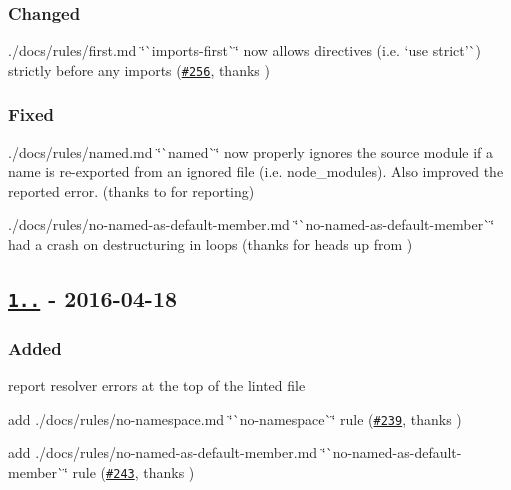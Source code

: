 \subsubsection*{Changed}


\begin{DoxyItemize}
\item ./docs/rules/first.md \char`\"{}\`{}imports-\/first\`{}\char`\"{} now allows directives (i.\+e. `\textquotesingle{}use strict'\`{}) strictly before any imports (\href{https://github.com/benmosher/eslint-plugin-import/pull/256}{\tt \#256}, thanks \href{https://github.com/lemonmade}{\tt })
\end{DoxyItemize}

\subsubsection*{Fixed}


\begin{DoxyItemize}
\item ./docs/rules/named.md \char`\"{}\`{}named\`{}\char`\"{} now properly ignores the source module if a name is re-\/exported from an ignored file (i.\+e. {\ttfamily node\+\_\+modules}). Also improved the reported error. (thanks to \href{https://github.com/jimbolla}{\tt } for reporting)
\item ./docs/rules/no-\/named-\/as-\/default-\/member.md \char`\"{}\`{}no-\/named-\/as-\/default-\/member\`{}\char`\"{} had a crash on destructuring in loops (thanks for heads up from \href{https://github.com/lemonmade}{\tt })
\end{DoxyItemize}

\subsection*{\href{https://github.com/benmosher/eslint-plugin-import/compare/v1.4.0...v1.5.0}{\tt 1..} -\/ 2016-\/04-\/18}

\subsubsection*{Added}


\begin{DoxyItemize}
\item report resolver errors at the top of the linted file
\item add ./docs/rules/no-\/namespace.md \char`\"{}\`{}no-\/namespace\`{}\char`\"{} rule (\href{https://github.com/benmosher/eslint-plugin-import/pull/239}{\tt \#239}, thanks \href{https://github.com/singles}{\tt })
\item add ./docs/rules/no-\/named-\/as-\/default-\/member.md \char`\"{}\`{}no-\/named-\/as-\/default-\/member\`{}\char`\"{} rule (\href{https://github.com/benmosher/eslint-plugin-import/pull/243}{\tt \#243}, thanks \href{https://github.com/dmnd}{\tt })
\end{DoxyItemize}

